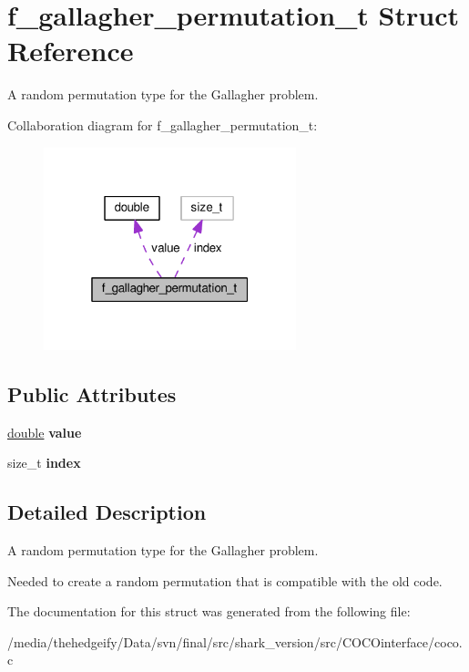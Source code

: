 \hypertarget{structf__gallagher__permutation__t}{}\section{f\+\_\+gallagher\+\_\+permutation\+\_\+t Struct Reference}
\label{structf__gallagher__permutation__t}


A random permutation type for the Gallagher problem.  




Collaboration diagram for f\+\_\+gallagher\+\_\+permutation\+\_\+t\+:\nopagebreak
\begin{figure}[H]
\begin{center}
\leavevmode
\includegraphics[width=208pt]{structf__gallagher__permutation__t__coll__graph}
\end{center}
\end{figure}
\subsection*{Public Attributes}
\begin{DoxyCompactItemize}
\item 
\hyperlink{classdouble}{double} {\bfseries value}\hypertarget{structf__gallagher__permutation__t_ad3b347168f3c52a0030b6131cb9da75d}{}\label{structf__gallagher__permutation__t_ad3b347168f3c52a0030b6131cb9da75d}

\item 
size\+\_\+t {\bfseries index}\hypertarget{structf__gallagher__permutation__t_acb02cf747f09466e412e687df389bc66}{}\label{structf__gallagher__permutation__t_acb02cf747f09466e412e687df389bc66}

\end{DoxyCompactItemize}


\subsection{Detailed Description}
A random permutation type for the Gallagher problem. 

Needed to create a random permutation that is compatible with the old code. 

The documentation for this struct was generated from the following file\+:\begin{DoxyCompactItemize}
\item 
/media/thehedgeify/\+Data/svn/final/src/shark\+\_\+version/src/\+C\+O\+C\+Ointerface/coco.\+c\end{DoxyCompactItemize}
